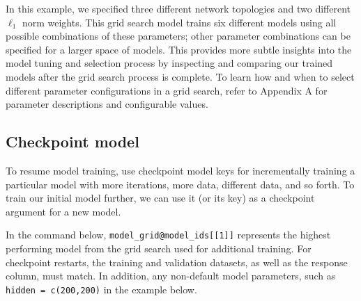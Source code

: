 \waterExampleInR


\waterExampleInPython



\normalsize
\noindent
In this example, we specified three different network topologies and two different $\ell_1$ norm weights. This grid search model trains six different models using all possible combinations of these parameters; other parameter combinations can be specified for a larger space of models. This provides more subtle insights into the model tuning and selection process by inspecting and comparing our trained models after the grid search process is complete. To learn how and when to select different parameter configurations in a grid search, refer to Appendix A for parameter descriptions and configurable values.

%
%
%

\waterExampleInR


\waterExampleInPython



\subsection{Checkpoint model}

To resume model training, use checkpoint model keys for incrementally training a particular model with more iterations, more data, different data, and so forth. To train our initial model further, we can use it (or its key) as a checkpoint argument for a new model.

In the command below, \texttt{model\_grid@model\_ids[[1]]} represents the highest performing model from the grid search used for additional training. For checkpoint restarts, the training and validation datasets, as well as the response column, must match.  In addition, any non-default model parameters, such as \texttt{hidden = c(200,200)} in the example below.


